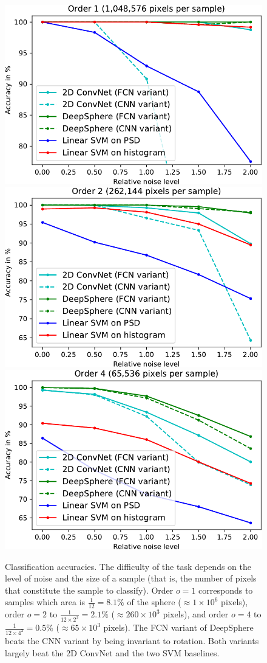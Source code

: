\documentclass{article} %
\newcommand{\1}{\b{1}}              %
\newcommand{\0}{\b{0}}              %
\begin{document}
\begin{figure}[t!]
	\centering
	\includegraphics[width=0.32\linewidth]{result_order1}
	\hfill
	\includegraphics[width=0.32\linewidth]{result_order2}
	\hfill
	\includegraphics[width=0.32\linewidth]{result_order4}
	\caption{
		Classification accuracies.
		The difficulty of the task depends on the level of noise and the size of a sample (that is, the number of pixels that constitute the sample to classify). Order $o=1$ corresponds to samples which area is $\frac{1}{12}=8.1\%$ of the sphere ($\approx 1 \times 10^6$ pixels), order $o=2$ to $\frac{1}{12 \times 2^2} = 2.1\%$ ($\approx 260 \times 10^3$ pixels), and order $o=4$ to $\frac{1}{12 \times 4^2} = 0.5\%$ ($\approx 65 \times 10^3$ pixels). 
		The FCN variant of DeepSphere beats the CNN variant by being invariant to rotation. Both variants largely beat the 2D ConvNet and the two SVM baselines.
	}
	\label{fig:results}
\end{figure}
\end{document}
